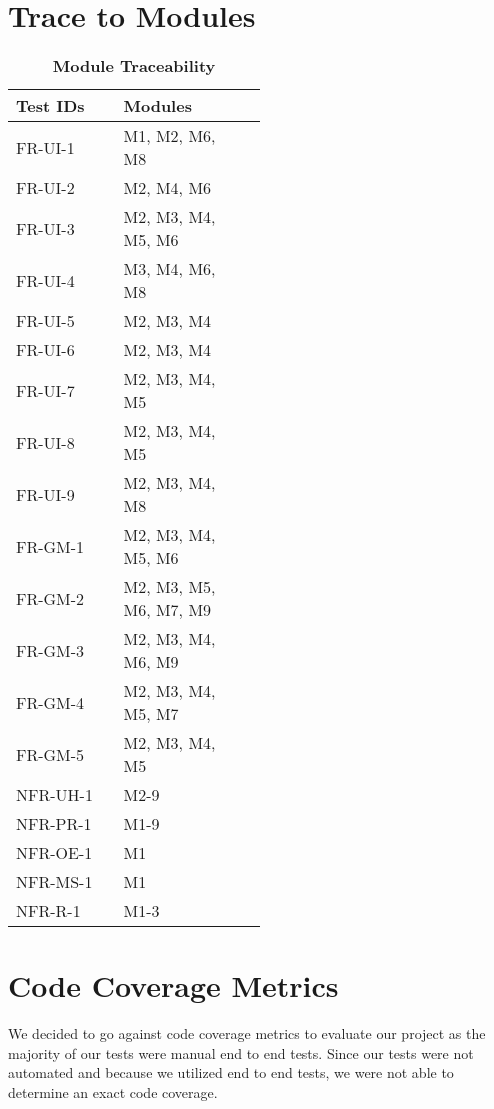 \documentclass[12pt, titlepage]{article}
\begin{document}
\section{Trace to Modules}	
\begin{table}[H]
\caption{\bf Module Traceability}
\begin{tabular}{|l|p{0.5\linewidth}|l|}
\hline
\multicolumn{1}{|l}{\bfseries Test IDs}  & \multicolumn{1}{l|}{\bfseries Modules}\\
\hline
FR-UI-1 & M1, M2, M6, M8 \\
\hline
FR-UI-2 & M2, M4, M6 \\
\hline
FR-UI-3 & M2, M3, M4, M5, M6 \\
\hline
FR-UI-4 & M3, M4, M6, M8 \\
\hline
FR-UI-5 & M2, M3, M4 \\
\hline
FR-UI-6 & M2, M3, M4 \\
\hline
FR-UI-7 & M2, M3, M4, M5 \\
\hline
FR-UI-8 & M2, M3, M4, M5  \\
\hline
FR-UI-9 & M2, M3, M4, M8 \\
\hline
FR-GM-1 & M2, M3, M4, M5, M6 \\
\hline
FR-GM-2 & M2, M3, M5, M6, M7, M9 \\
\hline
FR-GM-3 & M2, M3, M4, M6, M9 \\
\hline
FR-GM-4 & M2, M3, M4, M5, M7 \\
\hline
FR-GM-5 & M2, M3, M4, M5 \\
\hline
NFR-UH-1 & M2-9 \\
\hline
NFR-PR-1 &  M1-9 \\
\hline
NFR-OE-1 &  M1 \\
\hline
NFR-MS-1 &  M1 \\
\hline
NFR-R-1 & M1-3 \\
\hline

\end{tabular}
\end{table}

\section{Code Coverage Metrics}
We decided to go against code coverage metrics to evaluate our project as the majority of our tests were manual end to end tests. Since our tests were not automated and because we utilized end to end tests, we were not able to determine an exact code coverage. 



\end{document}
